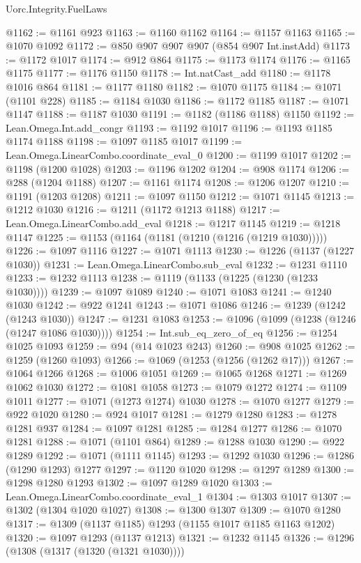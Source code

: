 \begin{lexlean}{Uorc.Integrity.FuelLaws}
\begin{coremodule}
@1162 := @1161 @923
@1163 := @1160 @1162
@1164 := @1157 @1163
@1165 := @1070 @1092
@1172 := @850 @907 @907 @907 (@854 @907 Int.instAdd)
@1173 := @1172 @1017
@1174 := @912 @864
@1175 := @1173 @1174
@1176 := @1165 @1175
@1177 := @1176 @1150
@1178 := Int.natCast_add
@1180 := @1178 @1016 @864
@1181 := @1177 @1180
@1182 := @1070 @1175
@1184 := @1071 (@1101 @228)
@1185 := @1184 @1030
@1186 := @1172 @1185
@1187 := @1071 @1147
@1188 := @1187 @1030
@1191 := @1182 (@1186 @1188) @1150
@1192 := Lean.Omega.Int.add_congr
@1193 := @1192 @1017
@1196 := @1193 @1185 @1174 @1188
@1198 := @1097 @1185 @1017
@1199 := Lean.Omega.LinearCombo.coordinate_eval_0
@1200 := @1199 @1017
@1202 := @1198 (@1200 @1028)
@1203 := @1196 @1202
@1204 := @908 @1174
@1206 := @288 (@1204 @1188)
@1207 := @1161 @1174
@1208 := @1206 @1207
@1210 := @1191 (@1203 @1208)
@1211 := @1097 @1150
@1212 := @1071 @1145
@1213 := @1212 @1030
@1216 := @1211 (@1172 @1213 @1188)
@1217 := Lean.Omega.LinearCombo.add_eval
@1218 := @1217 @1145
@1219 := @1218 @1147
@1225 := @1153 (@1164 (@1181 (@1210 (@1216 (@1219 @1030)))))
@1226 := @1097 @1116
@1227 := @1071 @1113
@1230 := @1226 (@1137 (@1227 @1030))
@1231 := Lean.Omega.LinearCombo.sub_eval
@1232 := @1231 @1110
@1233 := @1232 @1113
@1238 := @1119 (@1133 (@1225 (@1230 (@1233 @1030))))
@1239 := @1097 @1089
@1240 := @1071 @1083
@1241 := @1240 @1030
@1242 := @922 @1241
@1243 := @1071 @1086
@1246 := @1239 (@1242 (@1243 @1030))
@1247 := @1231 @1083
@1253 := @1096 (@1099 (@1238 (@1246 (@1247 @1086 @1030))))
@1254 := Int.sub_eq_zero_of_eq
@1256 := @1254 @1025 @1093
@1259 := @94 (@14 @1023 @243)
@1260 := @908 @1025
@1262 := @1259 (@1260 @1093)
@1266 := @1069 (@1253 (@1256 (@1262 @17)))
@1267 := @1064 @1266
@1268 := @1006 @1051
@1269 := @1065 @1268
@1271 := @1269 @1062 @1030
@1272 := @1081 @1058
@1273 := @1079 @1272
@1274 := @1109 @1011
@1277 := @1071 (@1273 @1274) @1030
@1278 := @1070 @1277
@1279 := @922 @1020
@1280 := @924 @1017
@1281 := @1279 @1280
@1283 := @1278 @1281 @937
@1284 := @1097 @1281
@1285 := @1284 @1277
@1286 := @1070 @1281
@1288 := @1071 (@1101 @864)
@1289 := @1288 @1030
@1290 := @922 @1289
@1292 := @1071 (@1111 @1145)
@1293 := @1292 @1030
@1296 := @1286 (@1290 @1293) @1277
@1297 := @1120 @1020
@1298 := @1297 @1289
@1300 := @1298 @1280 @1293
@1302 := @1097 @1289 @1020
@1303 := Lean.Omega.LinearCombo.coordinate_eval_1
@1304 := @1303 @1017
@1307 := @1302 (@1304 @1020 @1027)
@1308 := @1300 @1307
@1309 := @1070 @1280
@1317 := @1309 (@1137 @1185) @1293 (@1155 @1017 @1185 @1163 @1202)
@1320 := @1097 @1293 (@1137 @1213)
@1321 := @1232 @1145
@1326 := @1296 (@1308 (@1317 (@1320 (@1321 @1030))))

\end{coremodule}
\end{lexlean}
